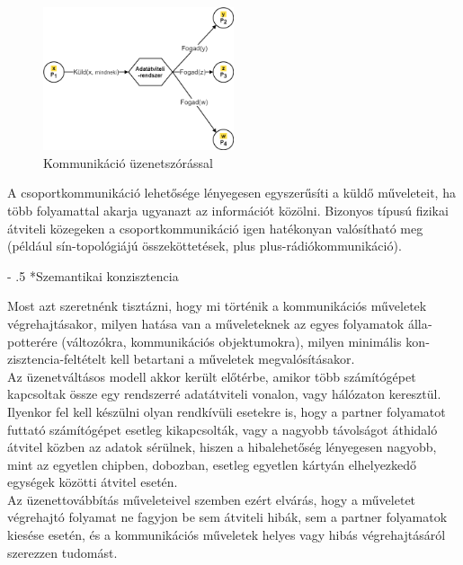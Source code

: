 \documentclass[tikz,12pt,margin=0px]{article}
\makeatletter
\renewcommand\paragraph{%
	\@startsection{paragraph}{4}{0mm}%
	{-\baselineskip}%
	{.5\baselineskip}%
	{\normalfont\normalsize\bfseries}}
\newcommand\lword[1]{\leavevmode\nobreak\hskip0pt plus\linewidth\penalty50\hskip0pt plus-\linewidth\nobreak #1}
\makeatother
\begin{document}
    \begin{figure}[H]
        \centering
        \includegraphics[width=0.5\textwidth]{img/broadcasting_communication.png}
        \caption{Kommunikáció üzenetszórással}
        \label{broadcasting_communication}
    \end{figure}

    \noindent A csoportkommunikáció lehetősége lényegesen egyszerűsíti a küldő műveleteit, ha több folyamattal akarja ugyanazt az információt közölni. Bizonyos típusú fizikai átviteli közegeken a csoportkommunikáció igen hatékonyan valósítható meg (például sín-topológiájú összeköttetések, \lword{rádiókommunikáció}).

    \paragraph*{Szemantikai konzisztencia}

    Most azt szeretnénk tisztázni, hogy mi történik a kommunikációs műveletek végrehajtásakor, milyen hatása van a műveleteknek az egyes folyamatok ál­la­­potterére (változókra, kommunikációs objektumokra), milyen minimális kon­zisztencia-feltételt kell betartani a műveletek megvalósításakor.\\

    \noindent Az üzenetváltásos modell akkor került előtérbe, amikor több számítógépet kapcsoltak össze egy rendszerré adatátviteli vonalon, vagy hálózaton keresztül. Ilyenkor fel kell készülni olyan rendkívüli esetekre is, hogy a partner folyamatot futtató számítógépet esetleg kikapcsolták, vagy a nagyobb távolságot áthidaló átvitel közben az adatok sérülnek, hiszen a hibalehetőség lényegesen nagyobb, mint az egyetlen chipben, dobozban, esetleg egyetlen kártyán elhelyezkedő egységek közötti átvitel esetén.\\

    \noindent Az üzenettovábbítás műveleteivel szemben ezért elvárás, hogy a műveletet végrehajtó folyamat ne fagyjon be sem átviteli hibák, sem a partner folyamatok kiesése esetén, és a kommunikációs műveletek helyes vagy hibás végrehajtásáról szerezzen tudomást.\\
\end{document}
